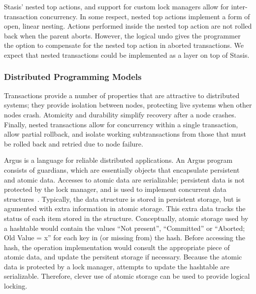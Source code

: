 \documentclass[letterpaper,twocolumn,10pt]{article}
\newcommand{\yad}{Stasis\xspace}
\newcommand{\yads}{Stasis'\xspace}
\begin{document}

\yads nested top actions, and support for custom lock managers
allow for inter-transaction concurrency.  In some respect, nested top
actions implement a form of open, linear nesting.  Actions performed
inside the nested top action are not rolled back when the parent aborts.
However, the logical undo gives the programmer the option to
compensate for the nested top action in aborted transactions.  We expect
that nested transactions
could be implemented as a layer on top of \yad.

\subsubsection{Distributed Programming Models}


Transactions provide a number of properties that are attractive to
distributed systems; they provide isolation between nodes, protecting
live systems when other nodes crash.  Atomicity and durability
simplify recovery after a node crashes.  Finally, nested transactions
allow for concurrency within a single transaction, allow partial
rollback, and isolate working subtransactions from those that must be
rolled back and retried due to node failure.

Argus is a language for reliable distributed applications.  An Argus
program consists of guardians, which are essentially objects that
encapsulate persistent and atomic data.  Accesses to atomic data are 
serializable; persistent data is not protected by the lock manager, 
and is used to implement concurrent data structures~\cite{argus}.  
Typically, the data structure is stored in persistent storage, but is agumented with
extra information in atomic storage.  This extra data tracks the
status of each item stored in the structure.  Conceptually, atomic 
storage used by a hashtable would contain the values ``Not present'',
``Committed'' or ``Aborted; Old Value = x'' for each key in (or
missing from) the hash.  Before accessing the hash, the operation
implementation would consult the appropriate piece of atomic data, and
update the persitent storage if necessary.  Because the atomic data is
protected by a lock manager, attempts to update the hashtable are serializable.
Therefore, clever use of atomic storage can be used to provide logical locking.
\end{document}
